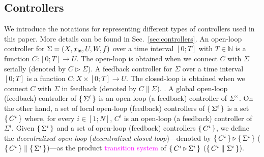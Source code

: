 \subsection{Controllers} We introduce the notations for representing different types of controllers used in this paper. More details can be found in Sec.~\ref{sec:controllers}. %
An open-loop controller for $\Sigma=(X,x_{\mathsf{in}},U,W,f)$ over a time interval $[0;T]$ with $T\in\mathbb N$ is a function $C\colon [0;T]\to U$. The open-loop is obtained when we connect $C$ with $\Sigma$ serially (denoted by $C \triangleright \Sigma$). %
 A feedback controller for $\Sigma$ over a time interval $[0;T]$ is a function $C\colon X\times[0;T]\to U$. The closed-loop is obtained when we connect $C$ with $\Sigma$ in feedback (denoted by $C\parallel\Sigma$). %
.
A global open-loop (feedback) controller of $\set{\Sigma^i} $ is an open-loop (a feedback) controller of $\Sigma^\times$.
On the other hand, a set of local open-loop (feedback) controllers of $\set{\Sigma^i} $ is a set $\set{C^i} $ where, for every $i\in [1;N]$, $C^i$ is an open-loop (a feedback) controller of $\Sigma^i$. Given $\set{\Sigma^i} $ and a set of open-loop (feedback) controllers $\set{C^i} $, we define the \emph{decentralized open-loop} (\emph{decentralized closed-loop})---denoted by $\set{C^i} \triangleright \set{\Sigma^i} $ ($\set{C^i} \parallel \set{\Sigma^i} $)---as the product \textcolor{magenta}{transition system} of $\set{C^i\triangleright \Sigma^i} $ ($\set{C^i\parallel \Sigma^i} $).

